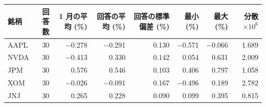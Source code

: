\begin{tabular}{lrrrrrrr}
\toprule
銘柄 & 回答数 & 1 月の平均 (\%) & 回答の平均 (\%) & 回答の標準偏差 (\%) & 最小 (\%) & 最大 (\%) & 分散 $\times 10^6$ \\
\midrule
AAPL & 30 & \ensuremath{-}0.278 & \ensuremath{-}0.291 & 0.130 & \ensuremath{-}0.571 & \ensuremath{-}0.066 & 1.689 \\
NVDA & 30 & \ensuremath{-}0.413 & 0.330 & 0.142 & 0.054 & 0.631 & 2.009 \\
JPM & 30 & 0.576 & 0.546 & 0.103 & 0.406 & 0.797 & 1.058 \\
XOM & 30 & \ensuremath{-}0.026 & \ensuremath{-}0.091 & 0.167 & \ensuremath{-}0.496 & 0.189 & 2.782 \\
JNJ & 30 & 0.265 & 0.228 & 0.090 & 0.099 & 0.395 & 0.815 \\
\bottomrule
\end{tabular}
